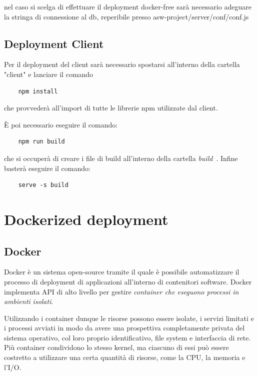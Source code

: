 \begin{warn}[ATTENTZIONE:]
nel caso si scelga di effettuare il deployment docker-free sarà necessario adeguare la stringa di connessione al db, reperibile presso asw-project/server/conf/conf.js
\end{warn}

\subsection{Deployment Client}

Per il deployment del client sarà necessario spostarsi all'interno della cartella "client" e lanciare il comando

\begin{verbatim}
    npm install
\end{verbatim}

che provvederà all'import di tutte le librerie npm utilizzate dal client.

È poi necessario eseguire il comando:
\begin{verbatim}
    npm run build
\end{verbatim}
che si occuperà di creare i file di build all'interno della cartella \textit{build}~\cite{ProductionReact:online}.\newline
Infine basterà eseguire il comando:
\begin{verbatim}
    serve -s build
\end{verbatim}

\section{Dockerized deployment}

\subsection{Docker}
Docker è un sistema open-source tramite il quale è possibile automatizzare il processo di deployment di applicazioni all'interno di contenitori software.\newline
Docker implementa API di alto livello per gestire \textit{container che eseguono processi in ambienti isolati}.\newline

\noindent Utilizzando i container dunque le risorse possono essere isolate, i servizi limitati e i processi avviati in modo da avere una prospettiva completamente privata del sistema operativo, col loro proprio identificativo, file system e interfaccia di rete. Più container condividono lo stesso kernel, ma ciascuno di essi può essere costretto a utilizzare una certa quantità di risorse, come la CPU, la memoria e l'I/O.\newline

